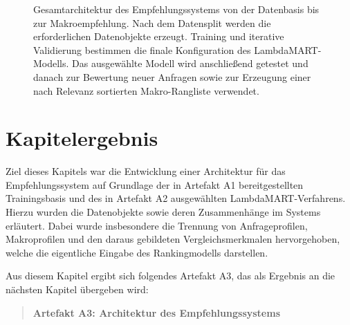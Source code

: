 \begin{figure}[H]
\caption{Gesamtarchitektur des Empfehlungssystems von der Datenbasis bis zur Makroempfehlung. Nach dem Datensplit werden die erforderlichen Datenobjekte erzeugt. 
Training und iterative Validierung bestimmen die finale Konfiguration des LambdaMART-Modells. 
Das ausgewählte Modell wird anschließend getestet und danach zur Bewertung neuer Anfragen sowie zur Erzeugung einer nach Relevanz sortierten Makro-Rangliste verwendet.
} 
\label{fig:prozessarchitektur_empfehlungssystem} 
\end{figure}


\section{Kapitelergebnis} 

Ziel dieses Kapitels war die Entwicklung einer Architektur für das Empfehlungssystem auf Grundlage der in Artefakt A1 bereitgestellten Trainingsbasis und des in Artefakt A2 ausgewählten LambdaMART-Verfahrens. 
Hierzu wurden die Datenobjekte sowie deren Zusammenhänge im Systems erläutert. Dabei wurde insbesondere die Trennung von Anfrageprofilen, Makroprofilen und den daraus gebildeten Vergleichsmerkmalen hervorgehoben, 
welche die eigentliche Eingabe des Rankingmodells darstellen. 

Aus diesem Kapitel ergibt sich folgendes Artefakt A3, das als Ergebnis an die nächsten Kapitel übergeben wird: 

\begin{quote} 
    \textbf{Artefakt A3: Architektur des Empfehlungssystems} 
\end{quote} 


